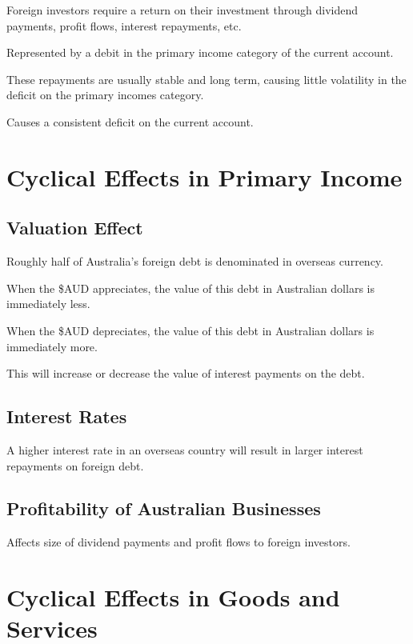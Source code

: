 \documentclass[a4paper,11pt]{article}
\begin{document}
Foreign investors require a return on their investment through dividend
payments, profit flows, interest repayments, etc.

Represented by a debit in the primary income category of the current account.

These repayments are usually stable and long term, causing little volatility
in the deficit on the primary incomes category.

Causes a consistent deficit on the current account.




\section{Cyclical Effects in Primary Income}

\subsection{Valuation Effect}

Roughly half of Australia's foreign debt is denominated in overseas currency.

When the \$AUD appreciates, the value of this debt in Australian dollars is
immediately less.

When the \$AUD depreciates, the value of this debt in Australian dollars is
immediately more.

This will increase or decrease the value of interest payments on the debt.


\subsection{Interest Rates}

A higher interest rate in an overseas country will result in larger interest
repayments on foreign debt.


\subsection{Profitability of Australian Businesses}

Affects size of dividend payments and profit flows to foreign investors.




\section{Cyclical Effects in Goods and Services}
\end{document}
